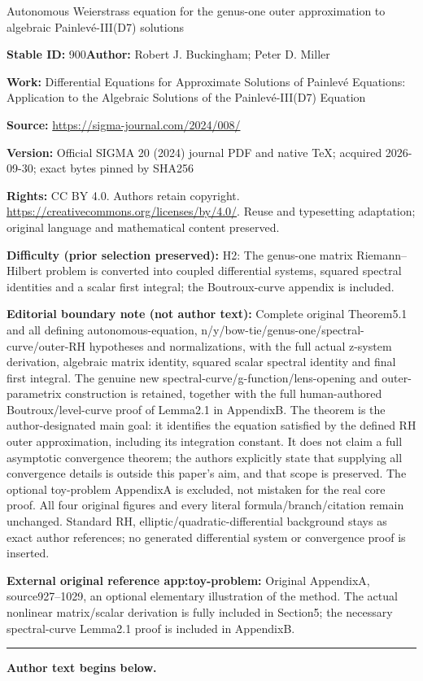 \documentclass[11pt]{article}
\numberwithin{equation}{section}
\numberwithin{equation}{section}
\begin{document}
\begin{center}\Large Autonomous Weierstrass equation for the genus-one outer approximation to algebraic Painlevé-III(D7) solutions\end{center}
\noindent\textbf{Stable ID:} 900\quad\textbf{Author:} Robert J. Buckingham; Peter D. Miller\par
\noindent\textbf{Work:} Differential Equations for Approximate Solutions of Painlevé Equations: Application to the Algebraic Solutions of the Painlevé-III(D7) Equation\par
\noindent\textbf{Source:} \url{https://sigma-journal.com/2024/008/}\par
\noindent\textbf{Version:} Official SIGMA 20 (2024) journal PDF and native TeX; acquired 2026-09-30; exact bytes pinned by SHA256\par
\noindent\textbf{Rights:} CC BY 4.0. Authors retain copyright. \url{https://creativecommons.org/licenses/by/4.0/}. Reuse and typesetting adaptation; original language and mathematical content preserved.\par
\noindent\textbf{Difficulty (prior selection preserved):} {\CJKfont H2: The genus-one matrix Riemann–Hilbert problem is converted into coupled differential systems, squared spectral identities and a scalar first integral; the Boutroux-curve appendix is included.}\par
\medskip\noindent\textbf{Editorial boundary note (not author text):} Complete original Theorem5.1 and all defining autonomous-equation, n/y/bow-tie/genus-one/spectral-curve/outer-RH hypotheses and normalizations, with the full actual z-system derivation, algebraic matrix identity, squared scalar spectral identity and final first integral. The genuine new spectral-curve/g-function/lens-opening and outer-parametrix construction is retained, together with the full human-authored Boutroux/level-curve proof of Lemma2.1 in AppendixB. The theorem is the author-designated main goal: it identifies the equation satisfied by the defined RH outer approximation, including its integration constant. It does not claim a full asymptotic convergence theorem; the authors explicitly state that supplying all convergence details is outside this paper’s aim, and that scope is preserved. The optional toy-problem AppendixA is excluded, not mistaken for the real core proof. All four original figures and every literal formula/branch/citation remain unchanged. Standard RH, elliptic/quadratic-differential background stays as exact author references; no generated differential system or convergence proof is inserted.\par
\noindent\textbf{External original reference app:toy-problem:} Original AppendixA, source927–1029, an optional elementary illustration of the method. The actual nonlinear matrix/scalar derivation is fully included in Section5; the necessary spectral-curve Lemma2.1 proof is included in AppendixB.\par
\medskip\hrule\medskip\noindent\textbf{Author text begins below.}\par
\end{document}
